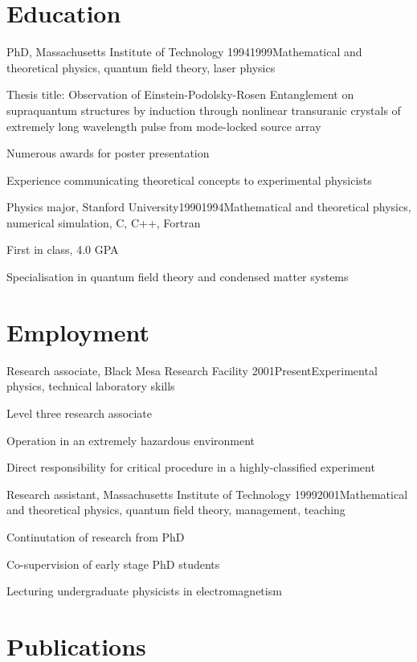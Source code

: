 \documentclass[sans]{resumay}
\begin{document}
\maketitle

\section{Education}

\begin{positionlist}{PhD, Massachusetts Institute of Technology
  }{1994}{1999}{Mathematical and theoretical physics, quantum field theory,
  laser physics}
  \item Thesis title: Observation of Einstein-Podolsky-Rosen Entanglement on
    supraquantum structures by induction through nonlinear transuranic crystals
    of extremely long wavelength pulse from mode-locked source array
  \item Numerous awards for poster presentation
  \item Experience communicating theoretical concepts to experimental physicists
\end{positionlist}

\begin{positionlist}{Physics major, Stanford
  University}{1990}{1994}{Mathematical and theoretical physics, numerical
  simulation, C, C++, Fortran}
  \item First in class, 4.0 GPA
  \item Specialisation in quantum field theory and condensed matter systems
\end{positionlist}

\section{Employment}

\begin{positionlist}{Research associate, Black Mesa Research Facility
  }{2001}{Present}{Experimental physics, technical laboratory skills}
  \item Level three research associate
  \item Operation in an extremely hazardous environment
  \item Direct responsibility for critical procedure in a highly-classified
    experiment
\end{positionlist}

\begin{positionlist}{Research assistant, Massachusetts Institute of Technology
  }{1999}{2001}{Mathematical and theoretical physics, quantum field theory,
  management, teaching}
  \item Continutation of research from PhD
  \item Co-supervision of early stage PhD students
  \item Lecturing undergraduate physicists in electromagnetism
\end{positionlist}

\section{Publications}
\end{document}
